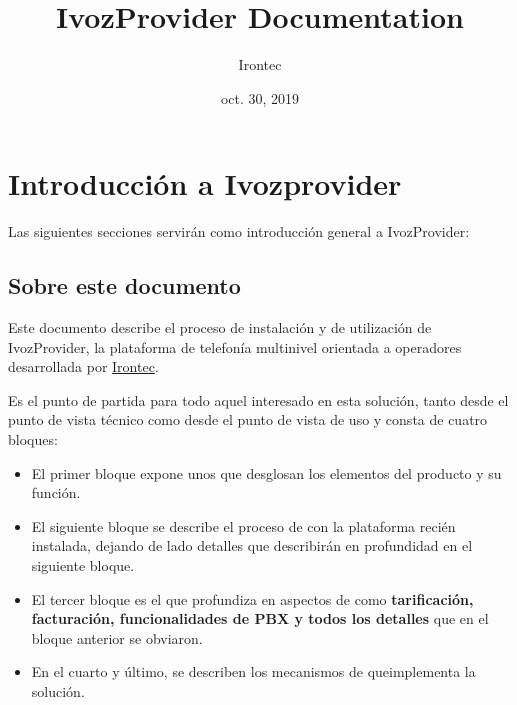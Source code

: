 \documentclass[letterpaper,10pt,spanish]{sphinxmanual}
\title{IvozProvider Documentation}
\date{oct. 30, 2019}
\author{Irontec}
\begin{document}
\maketitle
\tableofcontents
{}\label{index::doc}



\chapter{Introducción a Ivozprovider}
\label{intro/index::doc}\label{intro/index:introduction-to-ivozprovider}\label{intro/index:ivozprovider-official-documentation}
Las siguientes secciones servirán como introducción general a IvozProvider:


\section{Sobre este documento}
\label{intro/about:about-this-document}\label{intro/about::doc}
Este documento describe el proceso de instalación y de utilización de IvozProvider, la plataforma de telefonía multinivel orientada a operadores desarrollada por \href{http://irontec.com}{Irontec}.

Es el punto de partida para todo aquel interesado en esta solución, tanto desde el punto de vista técnico como desde el punto de vista de uso y consta de cuatro bloques:
\begin{itemize}
\item {} 
El primer bloque expone unos {\hyperref[index:concepts]{}} que desglosan los elementos del producto y su función.

\item {} 
El siguiente bloque se describe el proceso de {\hyperref[index:installation]{}} con la plataforma recién instalada, dejando de lado detalles que describirán en profundidad en el siguiente bloque.

\item {} 
El tercer bloque es el que profundiza en aspectos de {\hyperref[index:advanced]{}} como \textbf{tarificación, facturación, funcionalidades de PBX y todos los detalles} que en el bloque anterior se obviaron.

\item {} 
En el cuarto y último, se describen los mecanismos de {\hyperref[index:security]{}} queimplementa la solución.

\end{itemize}
\end{document}
